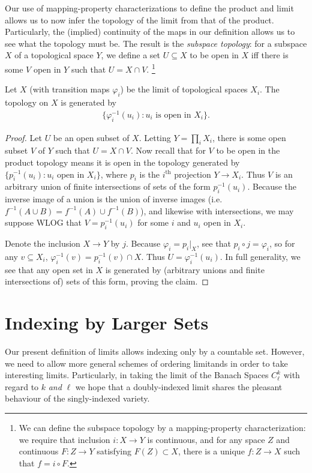       Our use of mapping-property characterizations to define the product and limit allows us to now infer the topology of the limit from that of the product.
      Particularly, the (implied) continuity of the maps in our definition allows us to see what the topology must be.
      The result is the \emph{subspace topology}: for a subspace $X$ of a topological space $Y$, we define a set $U\subseteq X$ to be open in $X$ iff there is some $V$ open in $Y$ such that $U=X\cap V$.%
      \footnote{We can define the subspace topology by a mapping-property characterization: we require that inclusion $i:X\rightarrow Y$ is continuous, and for any space $Z$ and continuous $F:Z\rightarrow Y$ satisfying $F(Z)\subset X$, there is a unique $f:Z\rightarrow X$ such that $f=i\circ F$.}

      \begin{claim}
        Let $X$ (with transition maps $\varphi_i$) be the limit of topological spaces $X_i$.
        The topology on $X$ is generated by
        \begin{align*}
          \{\varphi_i^{-1}(u_i):u_i\text{ is open in } X_i\}\text{.}
        \end{align*}
        \begin{proof}
          Let $U$ be an open subset of $X$.
          Letting $Y=\prod_i X_i$, there is some open subset $V$ of $Y$ such that $U=X\cap V$.
          Now recall that for $V$ to be open in the product topology means it is open in the topology generated by $\{p_i^{-1}(u_i):u_i\text{ open in }X_i\}$, where $p_i$ is the $i^\text{th}$ projection $Y\rightarrow X_i$.
          Thus $V$ is an arbitrary union of finite intersections of sets of the form $p_i^{-1}(u_i)$.
          Because the inverse image of a union is the union of inverse images (i.e. $f^{-1}(A\cup B)=f^{-1}(A)\cup f^{-1}(B)$), and likewise with intersections, we may suppose WLOG that $V=p_i^{-1}(u_i)$ for some $i$ and $u_i$ open in $X_i$.
      
          Denote the inclusion $X\rightarrow Y$ by $j$.
          Because $\varphi_i=p_i|_X$, see that $p_i\circ j = \varphi_i$, so for any $v\subseteq X_i$, $\varphi_i^{-1}(v) = p_i^{-1}(v)\cap X$.
          Thus $U=\varphi_i^{-1}(u_i)$.
          In full generality, we see that any open set in $X$ is generated by (arbitrary unions and finite intersections of) sets of this form, proving the claim.
        \end{proof}
      \end{claim}

    \section{Indexing by Larger Sets}
      Our present definition of limits allows indexing only by a countable set.
      However, we need to allow more general schemes of ordering limitands in order to take interesting limits.
      Particularly, in taking the limit of the Banach Spaces $C^k_\ell$ with regard to $k$ \emph{and} $\ell$ we hope that a doubly-indexed limit shares the pleasant behaviour of the singly-indexed variety.
      
